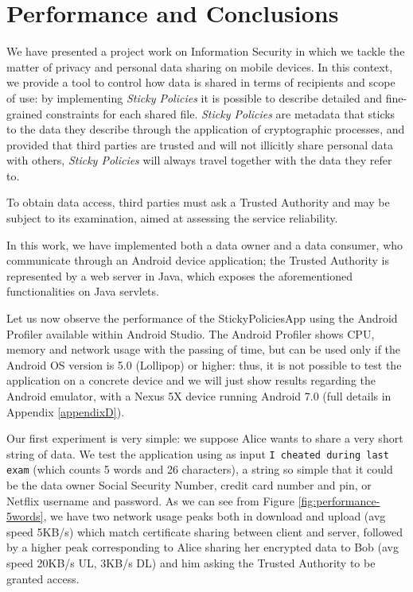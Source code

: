 \chapter{Performance and Conclusions}
\label{chapter4}
\thispagestyle{empty}

\noindent We have presented a project work on Information Security in which we tackle the matter of privacy and personal data sharing on mobile devices. In this context, we provide a tool to control how data is shared in terms of recipients and scope of use: by implementing \textit{Sticky Policies} it is possible to describe detailed and fine-grained constraints for each shared file. \textit{Sticky Policies} are metadata that sticks to the data they describe through the application of cryptographic processes, and provided that third parties are trusted and will not illicitly share personal data with others, \textit{Sticky Policies} will always travel together with the data they refer to.

To obtain data access, third parties must ask a Trusted Authority and may be subject to its examination, aimed at assessing the service reliability.

In this work, we have implemented both a data owner and a data consumer, who communicate through an Android device application; the Trusted Authority is represented by a web server in Java, which exposes the aforementioned functionalities on Java servlets.

Let us now observe the performance of the StickyPoliciesApp using the Android Profiler available within Android Studio. The Android Profiler shows CPU, memory and network usage with the passing of time, but can be used only if the Android OS version is 5.0 (Lollipop) or higher: thus, it is not possible to test the application on a concrete device and we will just show results regarding the Android emulator, with a Nexus 5X device running Android 7.0 (full details in Appendix \ref{appendixD}).

Our first experiment is very simple: we suppose Alice wants to share a very short string of data. We test the application using as input \texttt{I cheated during last exam} (which counts 5 words and 26 characters), a string so simple that it could be the data owner Social Security Number, credit card number and pin, or Netflix username and password. As we can see from Figure \ref{fig:performance-5words}, we have two network usage peaks both in download and upload (avg speed 5KB/s) which match certificate sharing between client and server, followed by a higher peak corresponding to Alice sharing her encrypted data to Bob (avg speed 20KB/s UL, 3KB/s DL) and him asking the Trusted Authority to be granted access.

